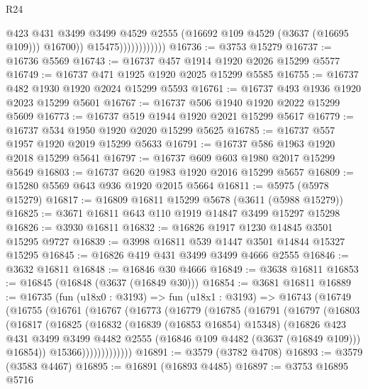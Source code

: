 \begin{lexlean}{R24}
\begin{coremodule}
                                @423
                                @431
                                @3499
                                @3499
                                @4529
                                @2555
                                (@16692 @109 @4529 (@3637 (@16695 @109)))
                                @16700))
                            @15475))))))))))))
@16736 := @3753 @15279
@16737 := @16736 @5569
@16743 := @16737 @457 @1914 @1920 @2026 @15299 @5577
@16749 := @16737 @471 @1925 @1920 @2025 @15299 @5585
@16755 := @16737 @482 @1930 @1920 @2024 @15299 @5593
@16761 := @16737 @493 @1936 @1920 @2023 @15299 @5601
@16767 := @16737 @506 @1940 @1920 @2022 @15299 @5609
@16773 := @16737 @519 @1944 @1920 @2021 @15299 @5617
@16779 := @16737 @534 @1950 @1920 @2020 @15299 @5625
@16785 := @16737 @557 @1957 @1920 @2019 @15299 @5633
@16791 := @16737 @586 @1963 @1920 @2018 @15299 @5641
@16797 := @16737 @609 @603 @1980 @2017 @15299 @5649
@16803 := @16737 @620 @1983 @1920 @2016 @15299 @5657
@16809 := @15280 @5569 @643 @936 @1920 @2015 @5664
@16811 := @5975 (@5978 @15279)
@16817 := @16809 @16811 @15299 @5678 (@3611 (@5988 @15279))
@16825 := @3671 @16811 @643 @110 @1919 @14847 @3499 @15297 @15298
@16826 := @3930 @16811
@16832 := @16826 @1917 @1230 @14845 @3501 @15295 @9727
@16839 := @3998 @16811 @539 @1447 @3501 @14844 @15327 @15295
@16845 := @16826 @419 @431 @3499 @3499 @4666 @2555
@16846 := @3632 @16811
@16848 := @16846 @30 @4666
@16849 := @3638 @16811
@16853 := @16845 (@16848 (@3637 (@16849 @30)))
@16854 := @3681 @16811
@16889 := @16735
    (fun (u18x0 : @3193) =>
    fun (u18x1 : @3193) =>
    @16743
      (@16749
        (@16755
          (@16761
            (@16767
              (@16773
                (@16779
                  (@16785
                    (@16791
                      (@16797
                        (@16803
                          (@16817
                            (@16825
                              (@16832
                                (@16839 (@16853 @16854) @15348)
                                (@16826
                                  @423
                                  @431
                                  @3499
                                  @3499
                                  @4482
                                  @2555
                                  (@16846 @109 @4482 (@3637 (@16849 @109)))
                                  @16854))
                              @15366)))))))))))))
@16891 := @3579 (@3782 @4708)
@16893 := @3579 (@3583 @4467)
@16895 := @16891 (@16893 @4485)
@16897 := @3753 @16895 @5716

\end{coremodule}
\end{lexlean}
